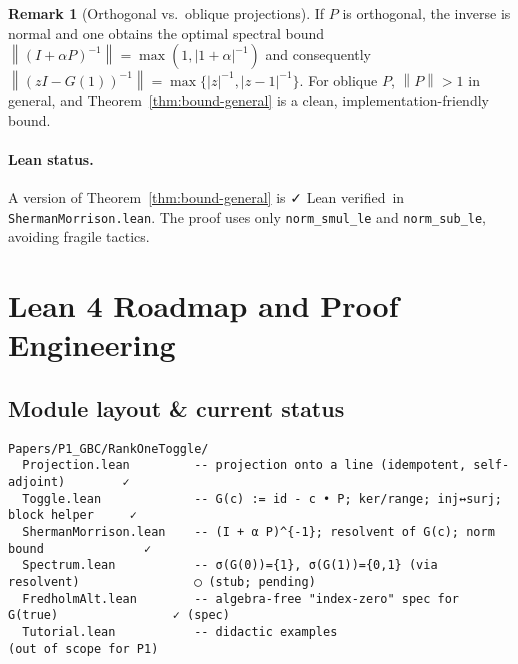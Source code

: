 \documentclass[11pt]{article}
\theoremstyle{definition}
\newtheorem{remark}[theorem]{Remark}
\newcommand{\norm}[1]{\left\lVert #1\right\rVert}
\newcommand{\leanok}{\textsf{\small \textcolor{green!60!black}{✓ Lean verified}}}
\begin{document}
\begin{remark}[Orthogonal vs.\ oblique projections]
If $P$ is orthogonal, the inverse is normal and one obtains the optimal spectral bound
\(
\norm{(I+\alpha P)^{-1}}=\max(1,|1+\alpha|^{-1})
\)
and consequently
\(
\norm{(zI-G(1))^{-1}}=\max\{|z|^{-1},|z-1|^{-1}\}.
\)
For oblique $P$, $\norm{P}>1$ in general, and Theorem~\ref{thm:bound-general} is a clean, implementation-friendly bound.
\end{remark}

\paragraph{Lean status.} A version of Theorem~\ref{thm:bound-general} is \leanok\ in \texttt{ShermanMorrison.lean}. The proof uses only \texttt{norm\_smul\_le} and \texttt{norm\_sub\_le}, avoiding fragile tactics.

\section{Lean 4 Roadmap and Proof Engineering}\label{sec:lean}

\subsection*{Module layout \& current status}
\begin{verbatim}
Papers/P1_GBC/RankOneToggle/
  Projection.lean         -- projection onto a line (idempotent, self-adjoint)        ✓
  Toggle.lean             -- G(c) := id - c • P; ker/range; inj↔surj; block helper     ✓
  ShermanMorrison.lean    -- (I + α P)^{-1}; resolvent of G(c); norm bound              ✓
  Spectrum.lean           -- σ(G(0))={1}, σ(G(1))={0,1} (via resolvent)                ◯ (stub; pending)
  FredholmAlt.lean        -- algebra-free "index-zero" spec for G(true)                ✓ (spec)
  Tutorial.lean           -- didactic examples                                         (out of scope for P1)
\end{verbatim}
\end{document}
